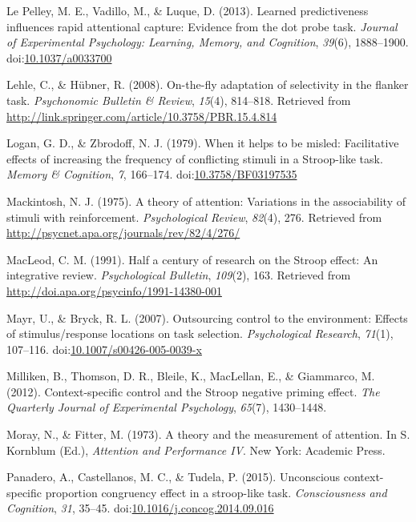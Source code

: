 \documentclass[english,,man,floatsintext]{apa6}
\begin{document}
\hypertarget{ref-le_pelley_learned_2013}{}
Le Pelley, M. E., Vadillo, M., \& Luque, D. (2013). Learned
predictiveness influences rapid attentional capture: Evidence from the
dot probe task. \emph{Journal of Experimental Psychology: Learning,
Memory, and Cognition}, \emph{39}(6), 1888--1900.
doi:\href{https://doi.org/10.1037/a0033700}{10.1037/a0033700}

\hypertarget{ref-lehle_fly_2008}{}
Lehle, C., \& Hübner, R. (2008). On-the-fly adaptation of selectivity in
the flanker task. \emph{Psychonomic Bulletin \& Review}, \emph{15}(4),
814--818. Retrieved from
\url{http://link.springer.com/article/10.3758/PBR.15.4.814}

\hypertarget{ref-logan_when_1979}{}
Logan, G. D., \& Zbrodoff, N. J. (1979). When it helps to be misled:
Facilitative effects of increasing the frequency of conflicting stimuli
in a Stroop-like task. \emph{Memory \& Cognition}, \emph{7}, 166--174.
doi:\href{https://doi.org/10.3758/BF03197535}{10.3758/BF03197535}

\hypertarget{ref-mackintosh_theory_1975}{}
Mackintosh, N. J. (1975). A theory of attention: Variations in the
associability of stimuli with reinforcement. \emph{Psychological
Review}, \emph{82}(4), 276. Retrieved from
\url{http://psycnet.apa.org/journals/rev/82/4/276/}

\hypertarget{ref-macleod_half_1991}{}
MacLeod, C. M. (1991). Half a century of research on the Stroop effect:
An integrative review. \emph{Psychological Bulletin}, \emph{109}(2),
163. Retrieved from \url{http://doi.apa.org/psycinfo/1991-14380-001}

\hypertarget{ref-mayr_outsourcing_2007}{}
Mayr, U., \& Bryck, R. L. (2007). Outsourcing control to the
environment: Effects of stimulus/response locations on task selection.
\emph{Psychological Research}, \emph{71}(1), 107--116.
doi:\href{https://doi.org/10.1007/s00426-005-0039-x}{10.1007/s00426-005-0039-x}

\hypertarget{ref-milliken_context-specific_2012}{}
Milliken, B., Thomson, D. R., Bleile, K., MacLellan, E., \& Giammarco,
M. (2012). Context-specific control and the Stroop negative priming
effect. \emph{The Quarterly Journal of Experimental Psychology},
\emph{65}(7), 1430--1448.

\hypertarget{ref-moray_theory_1973}{}
Moray, N., \& Fitter, M. (1973). A theory and the measurement of
attention. In S. Kornblum (Ed.), \emph{Attention and Performance IV}.
New York: Academic Press.

\hypertarget{ref-panadero_unconscious_2015}{}
Panadero, A., Castellanos, M. C., \& Tudela, P. (2015). Unconscious
context-specific proportion congruency effect in a stroop-like task.
\emph{Consciousness and Cognition}, \emph{31}, 35--45.
doi:\href{https://doi.org/10.1016/j.concog.2014.09.016}{10.1016/j.concog.2014.09.016}
\end{document}
